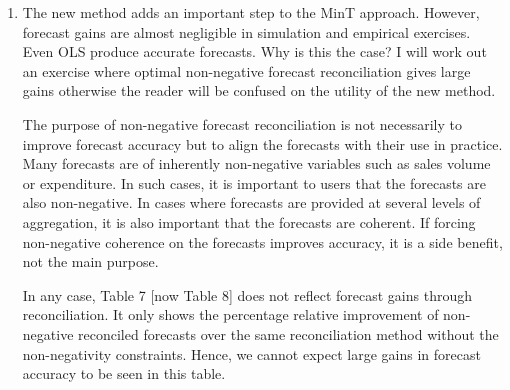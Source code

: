\documentclass[10pt,a4paper]{article}
\begin{document}
\begin{enumerate}
{  %
  }

\item
  The new method adds an important step to the MinT approach. However, forecast gains are almost negligible in simulation and empirical exercises. Even OLS produce accurate forecasts. Why is this the case? I will work out an exercise where optimal non-negative forecast reconciliation gives large gains otherwise the reader will be confused on the utility of the new method.

  {\color{blue} The purpose of non-negative forecast reconciliation is not necessarily to improve forecast accuracy but to align the forecasts with their use in practice. Many forecasts are of inherently non-negative variables such as sales volume or expenditure. In such cases, it is important to users that the forecasts are also non-negative. In cases where forecasts are provided at several levels of aggregation, it is also important that the forecasts are coherent. If forcing non-negative coherence on the forecasts improves accuracy, it is a side benefit, not the main purpose.

  In any case, Table 7 [now Table 8] does not reflect forecast gains through reconciliation. It only shows the percentage relative improvement of non-negative reconciled forecasts over the same reconciliation method without the non-negativity constraints. Hence, we cannot expect large gains in forecast accuracy to be seen in this table.

}
\end{enumerate}
\end{document}
